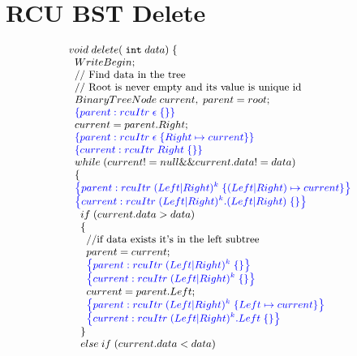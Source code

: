 \makeatletter
\newcommand{\srcsize}{\@setfontsize{\srcsize}{2pt}{2pt}}
\makeatother
\section{RCU BST Delete}
\label{appendix:bst_del}
\[\small
\begin{array}{@{}l@{}}
void\;delete(\;\INT\;data)\;\{\\
 \;\;WriteBegin;\\
   \;\;\text{// Find data in the tree} \\
   \;\;\text{// Root is never empty and its value is unique id} \\
    \;\;BinaryTreeNode \;current,\;parent = root;  \\
    \;\;\specline{parent:rcuItr\; \epsilon \; \{ \} }\\
    \;\;current = parent.Right;\\
    \;\;\specline{parent:rcuItr\; \epsilon \; \{ Right \mapsto current\} }\\
    \;\;\specline{current:rcuItr\; Right \; \{ \} }\\  
    \;\;while\;(current!=null \&\& current.data != data)\\
    \;\;\{\\
        \;\;\specline{parent:rcuItr\; (Left|Right)^{k} \; \{ (Left|Right) \mapsto current\} }\\
        \;\;\specline{current:rcuItr\; (Left|Right)^{k}.(Left|Right) \; \{ \} }\\
        \;\;\;\;if\;(current.data > data)\\
        \;\;\;\;\{\\
            \;\;\;\;\;\;\text{//if data exists it's in the left subtree}\\
            \;\;\;\;\;\;parent = current;\\
            \;\;\;\;\;\;\specline{parent:rcuItr\; (Left|Right)^{k} \; \{ \} }\\
            \;\;\;\;\;\;\specline{current:rcuItr\; (Left|Right)^{k} \; \{ \} }\\
            \;\;\;\;\;\;current = parent.Left;\\
            \;\;\;\;\;\;\specline{parent:rcuItr\; (Left|Right)^{k} \; \{ Left\mapsto current\} }\\
            \;\;\;\;\;\;\specline{current:rcuItr\; (Left|Right)^{k}.Left \; \{ \} }\\
        \;\;\;\;\}\\
        \;\;\;\;else \;if\; (current.data < data)\\

\end{array}\]
